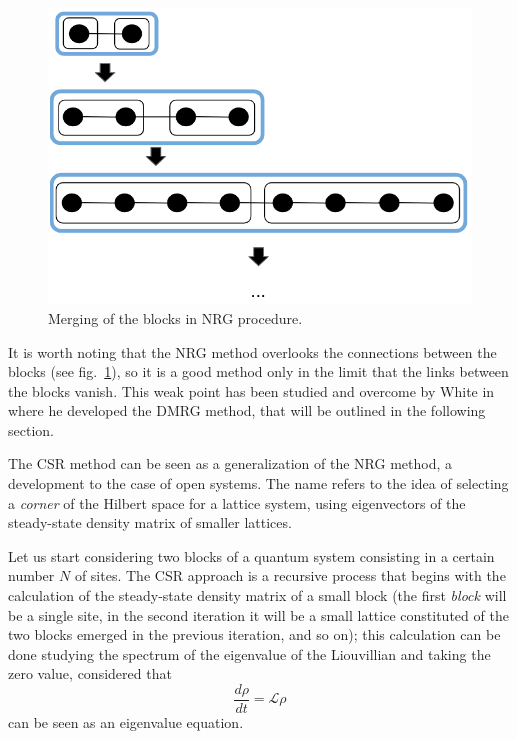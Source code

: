 \begin{figure}[H]
\centering
    \includegraphics[scale=0.5]{Figures/blocks_wilson}
    \captionsetup{width=1.\linewidth}
    \caption{Merging of the blocks in NRG procedure.}
    \label{fig:blocks_wilson}
\end{figure}

It is worth noting that the NRG method overlooks the connections between the blocks (see fig.~\ref{fig:blocks_wilson}), so it is a good method only in the limit that the links between the blocks vanish. This weak point has been studied and overcome by White in~\cite{s_white:dmrg} where he developed the DMRG method, that will be outlined in the following section.

The CSR method can be seen as a generalization of the NRG method, a development to the case of open systems. The name refers to the idea of selecting a \emph{corner} of the Hilbert space for a lattice system, using eigenvectors of the steady-state density matrix of smaller lattices.

Let us start considering two blocks of a quantum system consisting in a certain number $N$ of sites. The CSR approach is a recursive process that begins with the calculation of the steady-state density matrix of a small block (the first \emph{block} will be a single site, in the second iteration it will be a small lattice constituted of the two blocks emerged in the previous iteration, and so on); this calculation can be done studying the spectrum of the eigenvalue of the Liouvillian and taking the zero value, considered that
\begin{equation}
    \frac{d\rho}{dt} = \mathcal{L} \rho
\end{equation}
can be seen as an eigenvalue equation.

